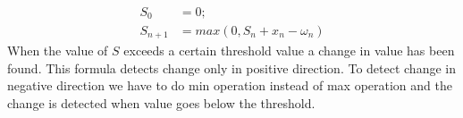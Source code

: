 \begin{align}
S_0 &= 0; \nonumber \\
S_{n+1} &= max(0, S_n + x_n - \omega_n) \nonumber
\end{align}
When the value of $S$ exceeds a certain threshold value a change in value has 
been found. This formula detects change only in positive direction. To detect 
change in negative direction we have to do min operation instead of max 
operation and the change  is detected when value goes below the threshold.

